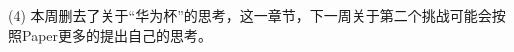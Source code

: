 \documentclass[letterpaper,12pt]{article}
\begin{document}
	(4) 本周删去了关于“华为杯”的思考，这一章节，下一周关于第二个挑战可能会按照Paper\cite{9796836}更多的提出自己的思考。
	
	
	
	
\end{document}
